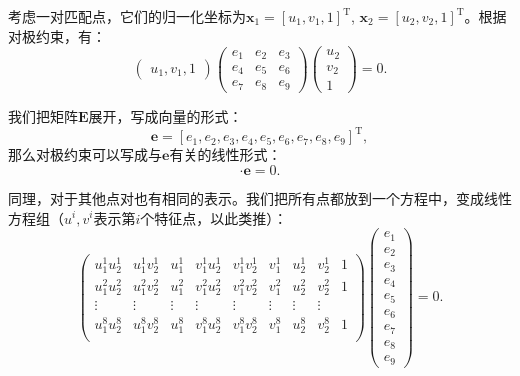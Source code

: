 考虑一对匹配点，它们的归一化坐标为$\bm{x}_{1}=[u_{1},v_{1},1]^\mathrm{T}$, $\bm{x}_{2}=[u_{2},v_{2},1]^{\mathrm{T}}$。根据对极约束，有：
\begin{equation}
\begin{pmatrix} 
u_{1},v_{1},1
\end{pmatrix}
\begin{pmatrix}
 e_{1} & e_{2} & e_{3}\\ 
 e_{4} & e_{5} & e_{6}\\ 
 e_{7} & e_{8} & e_{9} 
\end{pmatrix}
\begin{pmatrix} 
u_{2}\\v_{2}\\1
\end{pmatrix}
=0.
\end{equation}

我们把矩阵$\bm{E}$展开，写成向量的形式：
\[
\bm{e}= [e_{1},e_{2},e_{3},e_{4},e_{5},e_{6},e_{7},e_{8},e_{9}]^{\mathrm{T}},
\]
那么对极约束可以写成与$\bm{e}$有关的线性形式：
\begin{equation}
[u_{1}u_{2},u_{1}v_{2},u_{1},v_{1}u_{2},v_{1}v_{2},v_{1},u_{2},v_{2},1] \cdot  \bm{e}=0.
\end{equation}

同理，对于其他点对也有相同的表示。我们把所有点都放到一个方程中，变成线性方程组（$u^i, v^i$表示第$i$个特征点，以此类推）：
\begin{equation}
\label{Eq:eight-point}
\begin{pmatrix}
u_{1}^{1}u_{2}^{1}& u_{1}^{1}v_{2}^{1}& u_{1}^{1}& v_{1}^{1}u_{2}^{1}& v_{1}^{1}v_{2}^{1}& v_{1}^{1} &u_{2}^{1} &v_{2}^{1}&1\\
u_{1}^{2}u_{2}^{2}& u_{1}^{2}v_{2}^{2}& u_{1}^{2}& v_{1}^{2}u_{2}^{2}& v_{1}^{2}v_{2}^{2}& v_{1}^{2} &u_{2}^{2} &v_{2}^{2}&1\\
\vdots & \vdots & \vdots & \vdots & \vdots & \vdots & \vdots & \vdots \\
u_{1}^{8}u_{2}^{8}& u_{1}^{8}v_{2}^{8}& u_{1}^{8}& v_{1}^{8}u_{2}^{8}& v_{1}^{8}v_{2}^{8}& v_{1}^{8} &u_{2}^{8}&v_{2}^{8}&1\\
\end{pmatrix}
\begin{pmatrix}
e_{1}\\ e_{2}\\ e_{3}\\  e_{4}\\ e_{5}\\ e_{6}\\ e_{7}\\ e_{8}\\ e_{9}  
\end{pmatrix}
=0.
\end{equation}

